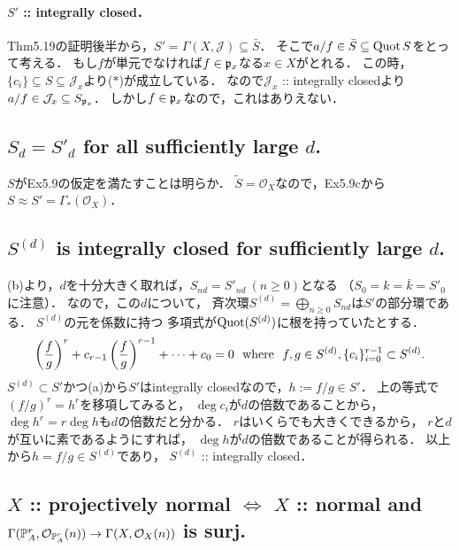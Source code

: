 \documentclass[a4paper]{jsarticle}
\newcommand{\shJ}{\mathcal{J}}
\newcommand{\shO}{\mathcal{O}}
\begin{document}
    \paragraph{$S'$ :: integrally closed．}
    Thm5.19の証明後半から，$S'=\Gamma(X,\shJ) \subseteq \bar{S}$．
    そこで$a/f \in \bar{S} \subseteq \operatorname{Quot} S$をとって考える．
    もし$f$が単元でなければ$f \in \mathfrak{p}_x$なる$x \in X$がとれる．
    この時，$\{c_i\} \subseteq S \subseteq \shJ_x$より($*$)が成立している．
    なので$\shJ_x$ :: integrally closedより$a/f \in \shJ_x \subseteq S_{\I{p}_x}$．
    しかし$f \in \mathfrak{p}_x$なので，これはありえない．

    \subsection{$S_d=S'_d$ for all sufficiently large $d$.}
    $S$がEx5.9の仮定を満たすことは明らか．
    $\tilde{S}=\shO_X$なので，Ex5.9cから$S \approx S'=\Gamma_*(\shO_X)$．

    \subsection{$S^{(d)}$ is integrally closed for sufficiently large $d$.}
    (b)より，$d$を十分大きく取れば，$S_{nd}=S'_{nd} ~(n \geq 0)$となる
    （$S_0=k=\bar{k}=S'_0$に注意）．
    なので，この$d$について，
    斉次環$S^{(d)}=\bigoplus_{n \geq 0} S_{nd}$は$S'$の部分環である．
    $S^{(d)}$の元を係数に持つ
    多項式が$\operatorname{Quot}(S^{(d)})$に根を持っていたとする．
    \[
        \left(\frac{f}{g}\right)^r+c_{r-1}\left(\frac{f}{g}\right)^{r-1}+\dots+c_0=0
        ~~\text{where}~~
        f,g \in S^{(d)}, \{c_i\}_{i=0}^{r-1} \subset S^{(d)}.
    \]
    $S^{(d)} \subset S'$かつ(a)から$S'$はintegrally closedなので，$h:=f/g \in S'$．
    上の等式で$(f/g)^r=h^r$を移項してみると，
    $\deg c_i$が$d$の倍数であることから，
    $\deg h^r=r \deg h$も$d$の倍数だと分かる．
    $r$はいくらでも大きくできるから，
    $r$と$d$が互いに素であるようにすれば，
    $\deg h$が$d$の倍数であることが得られる．
    以上から$h=f/g \in S^{(d)}$であり，
    $S^{(d)}$ :: integrally closed．

    \subsection{$X$ :: projectively normal $\iff$ $X$ :: normal and
        $\Gamma(\proj^r_A, \shO_{\proj^r_A}(n)) \to \Gamma(X,\shO_X(n))$ is surj.}
\end{document}
